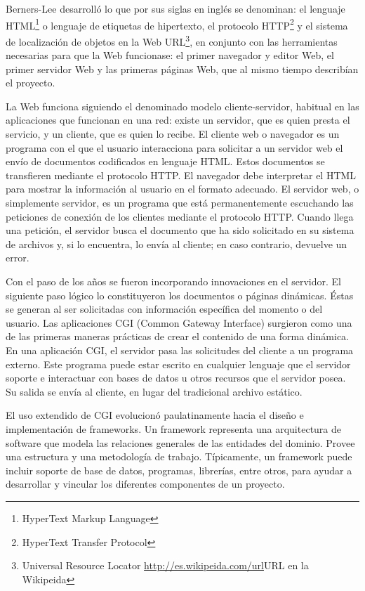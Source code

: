 \documentclass[a4paper]{report}
\begin{document}
Berners-Lee desarrolló lo que por sus siglas en inglés se denominan: el
lenguaje HTML\footnote{HyperText Markup Language} o lenguaje de etiquetas de
hipertexto, el protocolo HTTP\footnote{HyperText Transfer Protocol} y el sistema
de localización de objetos en la Web URL\footnote{Universal Resource
Locator \url{http://es.wikipeida.com/url}{URL en la Wikipeida}}, en conjunto
con las herramientas necesarias para que la Web funcionase: el primer navegador y
editor Web, el primer servidor Web y las primeras páginas Web, 
que al mismo tiempo describían el proyecto.

La Web funciona siguiendo el denominado modelo cliente-servidor, 
habitual en las aplicaciones que funcionan en una red: existe un servidor, 
que es quien presta el servicio, y un cliente, que es quien lo recibe.
El cliente web o navegador es un programa con el que el usuario interacciona 
para solicitar a un servidor web el envío de documentos codificados en
lenguaje HTML. Estos documentos se transfieren mediante el protocolo HTTP. El 
navegador debe interpretar el HTML para mostrar la información al usuario en el formato adecuado.
El servidor web, o simplemente servidor, es un programa que está permanentemente
escuchando las peticiones de conexión de los clientes mediante el protocolo
HTTP. Cuando llega una petición, el servidor busca el documento que ha sido
solicitado en su sistema de archivos y, si lo encuentra, lo envía al cliente;
en caso contrario, devuelve un error.

Con el paso de los años se fueron incorporando innovaciones en el servidor. El 
siguiente paso lógico lo constituyeron los documentos o páginas dinámicas. 
Éstas se generan al ser solicitadas con información específica del momento o 
del usuario. Las aplicaciones CGI (Common Gateway Interface) surgieron como una
de las primeras maneras prácticas de crear el contenido de una forma dinámica. 
En una aplicación CGI, el servidor pasa las solicitudes del cliente a un programa 
externo. Este programa puede estar escrito en cualquier lenguaje que el servidor 
soporte e interactuar con bases de datos u otros recursos que el servidor posea. 
Su salida se envía al cliente, en lugar del tradicional archivo estático.

El uso extendido de CGI evolucionó paulatinamente hacia el diseño e 
implementación de frameworks. Un framework representa una arquitectura de software que
modela las relaciones generales de las entidades del dominio. Provee una estructura
y una metodología de trabajo. Típicamente, un framework puede incluir soporte de 
base de datos, programas, librerías, entre otros, para ayudar a desarrollar y 
vincular los diferentes componentes de un proyecto.
\end{document}
